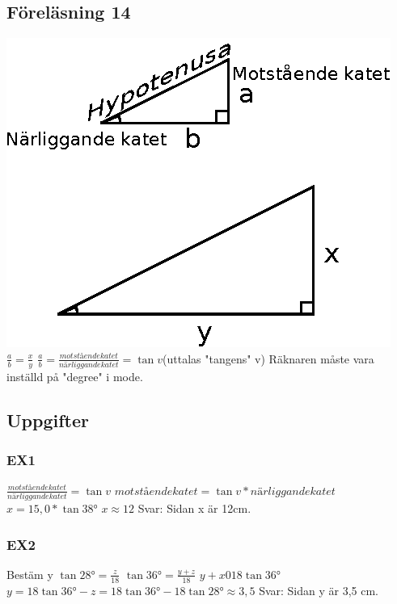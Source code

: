 \documentclass[a4paper,10pt]{article}
\begin{document}
\begin{flushleft}
\section{Föreläsning 14}
  \includegraphics{trigonometri.eps}\newline
  $ \frac{a}{b} = \frac{x}{y} $\newline
  $ \frac{a}{b} = \frac{motstående katet}{närliggande katet} = \tan v $(uttalas "tangens" v)\newline
  Räknaren måste vara inställd på "degree" i mode.\newline
  \subsection{Uppgifter}
    \subsubsection{EX1}
      $ \frac{motstående katet}{närliggande katet} = \tan v $\newline
      $ motstående katet = \tan v * närliggande katet $\newline
      $ x = 15,0*\tan 38° $\newline
      $ x \approx 12 $\newline\newline
      Svar: Sidan x är 12cm.
    \subsubsection{EX2}
      Bestäm y\newline
      $ \tan 28° = \frac{z}{18} $\newline
      $ \tan 36° = \frac{y+z}{18} $\newline
      $ y+x 0 18 \tan 36° $\newline
      $ y = 18 \tan 36°-z = 18 \tan 36° - 18 \tan 28° \approx 3,5 $\newline\newline
      Svar: Sidan y är 3,5 cm.

\end{flushleft}
\end{document}
